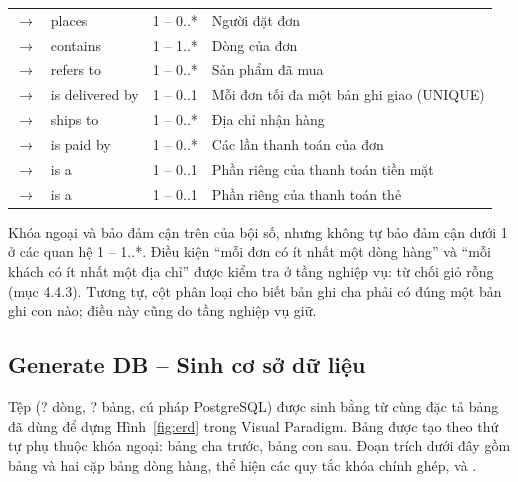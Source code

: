 \documentclass[12pt,a4paper]{article}
\providecommand{\sqlTableCount}{?}
\providecommand{\sqlLineCount}{?}
\begin{document}
\begin{longtable}{@{}P{4.9cm}P{2.4cm}P{1.6cm}P{6.6cm}@{}}
\small{} $\to$  & \small places & \small 1 -- 0..* & \small Người đặt đơn\\
\small{} $\to$  & \small contains & \small 1 -- 1..* & \small Dòng của đơn\\
\small{} $\to$  & \small refers to & \small 1 -- 0..* & \small Sản phẩm đã mua\\
\small{} $\to$  & \small is delivered by & \small 1 -- 0..1 & \small Mỗi đơn tối đa một bản ghi giao (UNIQUE)\\
\small{} $\to$  & \small ships to & \small 1 -- 0..* & \small Địa chỉ nhận hàng\\
\small{} $\to$  & \small is paid by & \small 1 -- 0..* & \small Các lần thanh toán của đơn\\
\small{} $\to$  & \small is a & \small 1 -- 0..1 & \small Phần riêng của thanh toán tiền mặt\\
\small{} $\to$  & \small is a & \small 1 -- 0..1 & \small Phần riêng của thanh toán thẻ\\
\bottomrule
\end{longtable}

Khóa ngoại và  bảo đảm cận trên của bội số, nhưng không tự bảo đảm cận dưới 1 ở các quan
hệ 1 -- 1..*. Điều kiện ``mỗi đơn có ít nhất một dòng hàng'' và ``mỗi khách có ít nhất một địa chỉ'' được
kiểm tra ở tầng nghiệp vụ:  từ chối giỏ rỗng (mục 4.4.3). Tương tự, cột
phân loại cho biết bản ghi cha phải có đúng một bản ghi con nào; điều này cũng do tầng nghiệp vụ giữ.

\subsection{Generate DB -- Sinh cơ sở dữ liệu}

Tệp  (\sqlLineCount{} dòng, \sqlTableCount{} bảng, cú pháp PostgreSQL) được
sinh bằng  từ cùng đặc tả bảng đã dùng để dựng Hình~\ref{fig:erd} trong Visual Paradigm. Bảng
được tạo theo thứ tự phụ thuộc khóa ngoại: bảng cha trước, bảng con sau. Đoạn trích dưới đây gồm bảng
 và hai cặp bảng dòng hàng, thể hiện các quy tắc khóa chính ghép,  và
.
\end{document}
